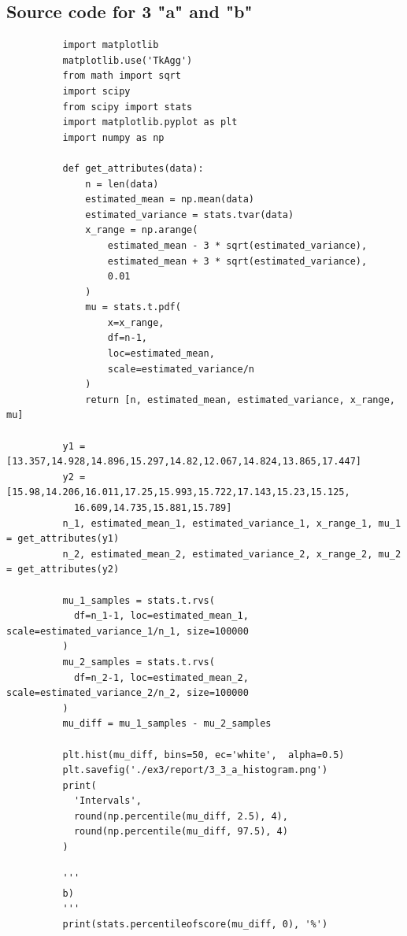 \documentclass[11pt,a4paper,english]{article}
\begin{document}
      \begin{appendices}
        \section{Source code for 3 "a" and "b"}
        \begin{verbatim}
          import matplotlib
          matplotlib.use('TkAgg')
          from math import sqrt
          import scipy
          from scipy import stats
          import matplotlib.pyplot as plt
          import numpy as np

          def get_attributes(data):
              n = len(data)
              estimated_mean = np.mean(data)
              estimated_variance = stats.tvar(data)
              x_range = np.arange(
                  estimated_mean - 3 * sqrt(estimated_variance),
                  estimated_mean + 3 * sqrt(estimated_variance),
                  0.01
              )
              mu = stats.t.pdf(
                  x=x_range,
                  df=n-1,
                  loc=estimated_mean,
                  scale=estimated_variance/n
              )
              return [n, estimated_mean, estimated_variance, x_range, mu]

          y1 = [13.357,14.928,14.896,15.297,14.82,12.067,14.824,13.865,17.447]
          y2 = [15.98,14.206,16.011,17.25,15.993,15.722,17.143,15.23,15.125,
            16.609,14.735,15.881,15.789]
          n_1, estimated_mean_1, estimated_variance_1, x_range_1, mu_1 = get_attributes(y1)
          n_2, estimated_mean_2, estimated_variance_2, x_range_2, mu_2 = get_attributes(y2)

          mu_1_samples = stats.t.rvs(
            df=n_1-1, loc=estimated_mean_1, scale=estimated_variance_1/n_1, size=100000
          )
          mu_2_samples = stats.t.rvs(
            df=n_2-1, loc=estimated_mean_2, scale=estimated_variance_2/n_2, size=100000
          )
          mu_diff = mu_1_samples - mu_2_samples

          plt.hist(mu_diff, bins=50, ec='white',  alpha=0.5)
          plt.savefig('./ex3/report/3_3_a_histogram.png')
          print(
            'Intervals',
            round(np.percentile(mu_diff, 2.5), 4),
            round(np.percentile(mu_diff, 97.5), 4)
          )

          '''
          b)
          '''
          print(stats.percentileofscore(mu_diff, 0), '%')
        \end{verbatim}
      \end{appendices}
  
\end{document}
